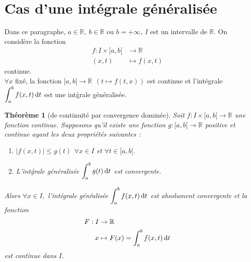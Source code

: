 \documentclass[11pt, a4paper]{book}
\newtheorem{teo}{Th\'eor\`eme}[section]
\begin{document}
\section{Cas d'une int\'egrale g\'en\'eralis\'ee}
Dans ce paragraphe, $a\in \mathbb{R},~b\in \mathbb{R}$ ou $b=+\infty,~I$ est un intervalle de $\mathbb{R}.$ On consid\`ere la fonction \begin{align*}
f:I\times[a,b[&\rightarrow\mathbb{R}\\(x,t)&\mapsto f(x,t)
\end{align*} continue.\\ $\forall x$ fix\'e, la fonction $[a,b[\rightarrow\mathbb{R}~~(t\mapsto f(t,x))$ est continue et l'int\'egrale ${\displaystyle \int_a^b f(x,t)\,\mathrm{d} t}$ est une int\'grale g\'en\'eralis\'ee.
\begin{teo}[de continuit\'e par convergence domin\'ee] \label{teo6.4.1} Soit $f:I\times[a,b[\rightarrow\mathbb{R}$ une fonction continue. Supposons qu'il existe une fonction $g:[a,b[\rightarrow\mathbb{R}$ positive et continue ayant les deux propri\'et\'es suivantes : 
\begin{enumerate}
\item $|f(x,t)|\leq g(t)~~\forall x\in I$ et $\forall t\in [a,b[.$ 
\item L'int\'grale g\'en\'eralis\'ee ${\displaystyle \int_a^bg(t)\,\mathrm{d} t}$ est convergente.
\end{enumerate}
Alors $\forall x\in I,$ l'int\'egrale g\'en\'ralis\'ee ${\displaystyle \int_a^bf(x,t)\,\mathrm{d} t}$ est absolument convergente et la fonction \begin{align*}
F:I&\rightarrow \mathbb{R}\\x&\mapsto F(x)=\int_a^bf(x,t)\,\mathrm{d} t
\end{align*} est continue dans $I$.
\end{teo}
\end{document}
